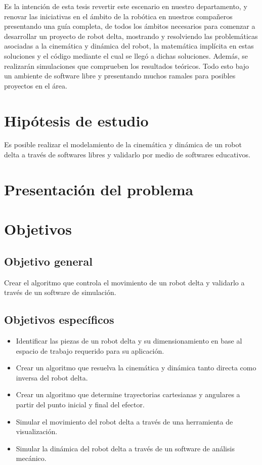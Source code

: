Es la intención de esta tesis revertir este escenario en nuestro departamento, y renovar las iniciativas en el ámbito de la robótica en nuestros compañeros presentando una guía completa, de todos los ámbitos necesarios para comenzar a desarrollar un proyecto de robot delta, mostrando y resolviendo las problemáticas asociadas a la cinemática y dinámica del robot, la matemática implícita en estas soluciones y el código mediante el cual se llegó a dichas soluciones. Además, se realizarán simulaciones que comprueben los resultados teóricos. Todo esto bajo un ambiente de software libre y presentando muchos ramales para posibles proyectos en el área.

\section{Hipótesis de estudio}
Es posible realizar el modelamiento de la cinemática y dinámica de un robot delta a través de softwares libres y validarlo por medio de softwares educativos.

\section{Presentación del problema}

\section{Objetivos}

    \subsection{Objetivo general}
        Crear el algoritmo que controla el movimiento de un robot delta y validarlo a través de un software de simulación.
\subsection{Objetivos específicos}
\begin{itemize}
    \item Identificar las piezas de un robot delta y su dimensionamiento en base al espacio de trabajo
    requerido para su aplicación.
    \item Crear un algoritmo que resuelva la cinemática y dinámica tanto directa como inversa del robot delta.
    \item Crear un algoritmo que determine trayectorias cartesianas y angulares a partir del punto inicial y final del efector.
    \item Simular el movimiento del robot delta a través de una herramienta de visualización.
    \item Simular la dinámica del robot delta a través de un software de análisis mecánico.
\end{itemize}

